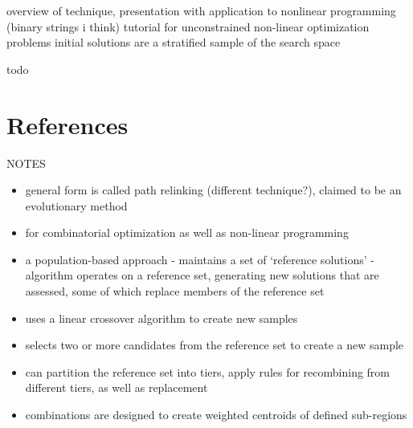 \documentclass[a4paper, 11pt]{article}
\begin{document}
overview of technique, presentation with application to nonlinear programming (binary strings i think) \cite{Glover2003b}
tutorial for unconstrained non-linear optimization problems
initial solutions are a stratified sample of the search space



todo





\section{References}
\label{sec:references}

NOTES
\begin{itemize}
	\item general form is called path relinking (different technique?), claimed to be an evolutionary method
	\item for combinatorial optimization as well as non-linear programming 
	\item a population-based approach - maintains a set of `reference solutions' - algorithm operates on a reference set, generating new solutions that are assessed, some of which replace members of the reference set
	\item uses a linear crossover algorithm to create new samples
	\item selects two or more candidates from the reference set to create a new sample
	\item can partition the reference set into tiers, apply rules for recombining from different tiers, as well as replacement
	\item combinations are designed to create weighted centroids of defined sub-regions
\end{itemize}
\end{document}
